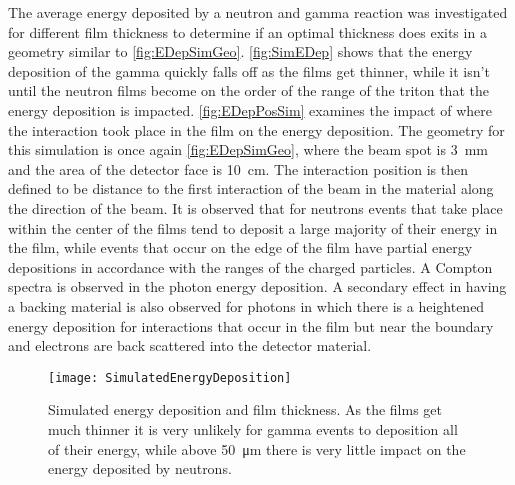 
The average energy deposited by a neutron and gamma reaction was investigated for different film thickness to determine if an optimal thickness does exits in a geometry similar to \autoref{fig:EDepSimGeo}.
\autoref{fig:SimEDep} shows that the energy deposition of the gamma quickly falls off as the films get thinner, while it isn't until the neutron films become on the order of the range of the triton that the energy deposition is impacted.
\autoref{fig:EDepPosSim} examines the impact of where the interaction took place in the film on the energy deposition.
The geometry for this simulation is once again \autoref{fig:EDepSimGeo}, where the beam spot is \SI{3}{\mm} and the area of the detector face is \SI{10}{\cm}. 
The interaction position is then defined to be distance to the first interaction of the beam in the material along the direction of the beam.
It is observed that for neutrons events that take place within the center of the films tend to deposit a large majority of their energy in the film, while events that occur on the edge of the film have partial energy depositions in accordance with the ranges of the charged particles.
A Compton spectra is observed in the photon energy deposition. 
A secondary effect in having a backing material is also observed for photons in which there is a heightened energy deposition for interactions that occur in the film but near the boundary and electrons are back scattered into the detector material.
\begin{figure}
  \centering
  \texttt{[image: SimulatedEnergyDeposition]}
  \caption[Simulated Energy Deposition and Film Thickness]{Simulated energy deposition and film thickness.  As the films get much thinner it is very unlikely for gamma events to deposition all of their energy, while above \SI{50}{\um} there is very little impact on the energy deposited by neutrons.}
  \label{fig:SimEDep}
\end{figure}

